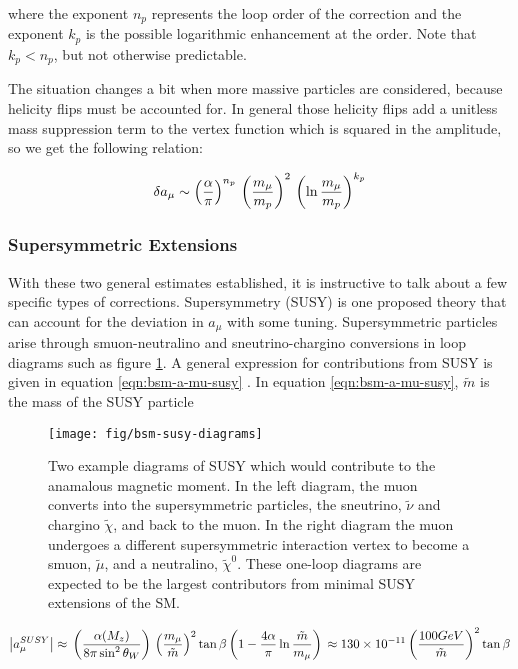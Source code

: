 \noindent
where the exponent $n_p$ represents the loop order of the correction and the exponent $k_p$ is the possible logarithmic enhancement at the order.  Note that $k_p < n_p$, but not otherwise predictable.

The situation changes a bit when more massive particles are considered, because helicity flips must be accounted for.  In general those helicity flips add a unitless mass suppression term to the vertex function which is squared in the amplitude, so we get the following relation:

\begin{equation}
\label{eqn:bsm-general-large-m}
\delta a_\mu \sim \left(\frac{\alpha}{\pi}\right)^{n_p} \\
\left(\frac{m_\mu}{m_p}\right)^2 \\
\left(\ln{\frac{m_\mu}{m_p}} \right)^{k_p}
\end{equation}

\subsubsection{Supersymmetric Extensions}
With these two general estimates established, it is instructive to talk about a few specific types of corrections.  Supersymmetry (SUSY) is one proposed theory that can account for the deviation in $a_\mu$ with some tuning.  Supersymmetric particles arise through smuon-neutralino and sneutrino-chargino conversions in loop diagrams such as figure \ref{fig:bsm-susy-diagrams}.  A general expression for contributions from SUSY is given in equation \ref{eqn:bsm-a-mu-susy} \cite{a-mu-harbinger}.  In equation \ref{eqn:bsm-a-mu-susy}, $\tilde{m}$ is the mass of the SUSY particle

\begin{figure}
\centering
\texttt{[image: fig/bsm-susy-diagrams]}
\caption{Two example diagrams of SUSY which would contribute to the anamalous magnetic moment. In the left diagram, the muon converts into the supersymmetric particles, the sneutrino, $\tilde{\nu}$ and chargino $\tilde{\chi}$, and back to the muon.  In the right diagram the muon undergoes a different supersymmetric interaction vertex to become a smuon, $\tilde{\mu}$, and a neutralino, $\tilde{\chi}^0$.  These one-loop diagrams are expected to be the largest contributors from minimal SUSY extensions of the SM. \label{fig:bsm-susy-diagrams}}
\end{figure}

\begin{equation}
\label{eqn:bsm-a-mu-susy}
\left|a_\mu^{SUSY}\right| \approx \\
\left(\frac{\alpha(M_z)}{8 \pi \sin^2{\theta_W}} \right) \\
\left( \frac{m_\mu}{\tilde{m}} \right)^2 \tan{\beta} \\
\left(1 - \frac{4\alpha}{\pi}\ln{\frac{\tilde{m}}{m_\mu}} \right) \\
\approx 130 \times 10^{-11} \\
\left(\frac{100 GeV}{\tilde{m}} \right)^2 \tan{\beta}
\end{equation}

